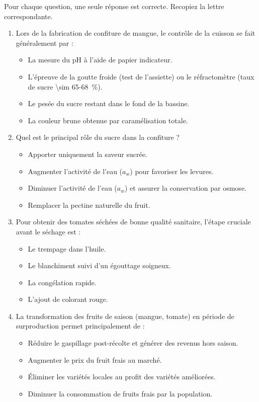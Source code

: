 \documentclass[11pt]{article}
\begin{document}
\begin{exercice}
Pour chaque question, une seule réponse est correcte. Recopiez la lettre correspondante.
\begin{enumerate}
    \item Lors de la fabrication de confiture de mangue, le contrôle de la cuisson se fait généralement par :
    \begin{itemize}
        \item[A] La mesure du pH à l'aide de papier indicateur.
        \item[B] L'épreuve de la goutte froide (test de l'assiette) ou le réfractomètre (taux de sucre \SI{\sim 65-68}{\%}).
        \item[C] Le pesée du sucre restant dans le fond de la bassine.
        \item[D] La couleur brune obtenue par caramélisation totale.
    \end{itemize}
    \item Quel est le principal rôle du sucre dans la confiture ?
    \begin{itemize}
        \item[A] Apporter uniquement la saveur sucrée.
        \item[B] Augmenter l'activité de l'eau ($a_w$) pour favoriser les levures.
        \item[C] Diminuer l'activité de l'eau ($a_w$) et assurer la conservation par osmose.
        \item[D] Remplacer la pectine naturelle du fruit.
    \end{itemize}
    \item Pour obtenir des tomates séchées de bonne qualité sanitaire, l'étape cruciale avant le séchage est :
    \begin{itemize}
        \item[A] Le trempage dans l'huile.
        \item[B] Le blanchiment suivi d'un égouttage soigneux.
        \item[C] La congélation rapide.
        \item[D] L'ajout de colorant rouge.
    \end{itemize}
    \item La transformation des fruits de saison (mangue, tomate) en période de surproduction permet principalement de :
    \begin{itemize}
        \item[A] Réduire le gaspillage post-récolte et générer des revenus hors saison.
        \item[B] Augmenter le prix du fruit frais au marché.
        \item[C] Éliminer les variétés locales au profit des variétés améliorées.
        \item[D] Diminuer la consommation de fruits frais par la population.
    \end{itemize}
\end{enumerate}
\end{exercice}
\end{document}

